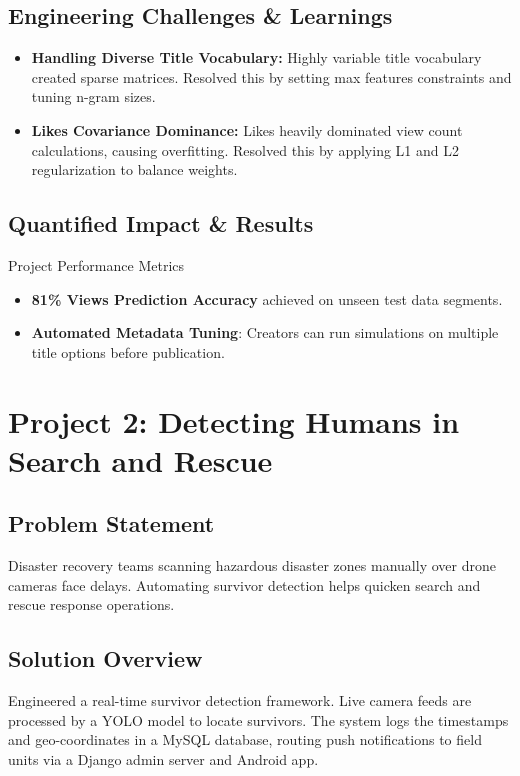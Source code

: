\documentclass[11pt,letterpaper]{article}
\begin{document}
\subsection{Engineering Challenges \& Learnings}
\begin{itemize}
    \item \textbf{Handling Diverse Title Vocabulary:} Highly variable title vocabulary created sparse matrices. Resolved this by setting max features constraints and tuning n-gram sizes.
    \item \textbf{Likes Covariance Dominance:} Likes heavily dominated view count calculations, causing overfitting. Resolved this by applying L1 and L2 regularization to balance weights.
\end{itemize}

\subsection{Quantified Impact \& Results}
\begin{metricbox}{Project Performance Metrics}
    \begin{itemize}
        \item \textbf{81\% Views Prediction Accuracy} achieved on unseen test data segments.
        \item \textbf{Automated Metadata Tuning}: Creators can run simulations on multiple title options before publication.
    \end{itemize}
\end{metricbox}

\vspace{0.2in}

\section{Project 2: Detecting Humans in Search and Rescue}

\subsection{Problem Statement}
Disaster recovery teams scanning hazardous disaster zones manually over drone cameras face delays. Automating survivor detection helps quicken search and rescue response operations.

\subsection{Solution Overview}
Engineered a real-time survivor detection framework. Live camera feeds are processed by a YOLO model to locate survivors. The system logs the timestamps and geo-coordinates in a MySQL database, routing push notifications to field units via a Django admin server and Android app.
\end{document}

